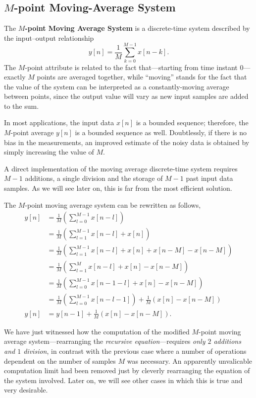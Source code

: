 \documentclass[\documentfontsize, twocolumn]{\classname}
\begin{document}
\subsection{$M$-point Moving-Average System}

The \textbf{$M$-point Moving Average System} is a discrete-time system described by the input--output relationship
\begin{equation}\label{eqn:mPointMovingAverageEquation}
    y[n] = \frac 1 M \sum_{k=0}^{M-1} x[n-k].
\end{equation}
The $M$-point attribute is related to the fact that---starting from time instant $0$---exactly $M$ points are averaged together, while ``moving'' stands for the fact that the value of the system can be interpreted as a constantly-moving average between points, since the output value will vary as new input samples are added to the sum.

In most applications, the input data $x[n]$ is a bounded sequence; therefore, the $M$-point average $y[n]$ is a bounded sequence as well. Doubtlessly, if there is no bias in the measurements, an improved estimate of the noisy data is obtained by simply increasing the value of $M$.

A direct implementation of the moving average discrete-time system requires $M-1$ additions, a single division and the storage of $M-1$ past input data samples. As we will see later on, this is far from the most efficient solution.

The $M$-point moving average system can be rewritten as follows,
\begin{align*}
    y[n] &= \frac 1 M \left(\sum_{l=0}^{M-1}x[n-l]\right) \\
         &= \frac 1 M \left(\sum_{l=1}^{M-1}x[n-l] + x[n]\right)\\
         &= \frac 1 M \left(\sum_{l=1}^{M-1}x[n-l] + x[n] + x[n - M] - x[n - M]\right)\\
         &= \frac 1 M \left(\sum_{l=1}^{M}x[n-l] + x[n] - x[n - M]\right)\\
         &= \frac 1 M \left(\sum_{l=0}^{M-1}x[n-1-l] + x[n] - x[n - M]\right)\\
         &= \frac 1 M \left(\sum_{l=0}^{M-1}x[n-l-1]\right) + \frac 1 M \left(x[n] - x[n - M]\right)\\
    y[n] &= y[n-1] + \frac 1 M \left(x[n] - x[n - M]\right).
\end{align*}

We have just witnessed how the computation of the modified $M$-point moving average system---rearranging the \emph{recursive equation}---requires \emph{only $2$ additions and $1$ division}, in contrast with the previous case where a number of operations dependent on the number of samples $M$ was necessary. An apparently unvalicable computation limit had been removed just by cleverly rearranging the equation of the system involved. Later on, we will see other cases in which this is true and very desirable.
\end{document}
